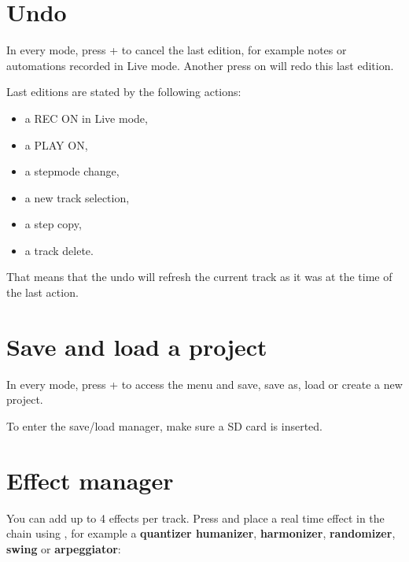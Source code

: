 


\section{Undo}

In every mode, press  +  to cancel the last edition, for example notes or automations recorded in Live mode. Another press on  will redo this last edition.

Last editions are stated by the following actions:

\begin{itemize}
\item a REC ON in Live mode,
\item a PLAY ON,
\item a stepmode change,
\item a new track selection,
\item a step copy,
\item a track delete.
\end{itemize}

That means that the undo will refresh the current track as it was at the time of the last action.


\section{Save and load a project}
In every mode, press  +  to access the menu and save, save as, load or create a new project.


To enter the save/load manager, make sure a SD card is inserted.


\section{Effect manager}

You can add up to 4 effects per track. Press  and place a real time effect in the chain using \encodericon{}, for example a \textbf{quantizer humanizer}, \textbf{harmonizer}, \textbf{randomizer}, \textbf{swing} or \textbf{arpeggiator}:


